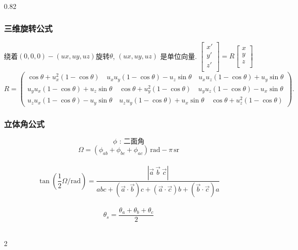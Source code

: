 \begin{small}
\begin{spacing}{0.82}
\subsubsection{三维旋转公式}
绕着$(0,0,0)-(ux,uy,uz)$旋转$\theta$, $(ux,uy,uz)$ 是单位向量. $
	\begin{bmatrix}
	x' \\
	y' \\
	z' \\
	\end{bmatrix} = R
	\begin{bmatrix}
	x \\
	y \\
	z \\
	\end{bmatrix}
	$
\[
R = \left(\begin{smallmatrix}
	\cos \theta +u_x^2 \left(1-\cos \theta\right) \quad
	u_x u_y \left(1-\cos \theta\right) - u_z \sin \theta \quad u_x u_z \left(1-\cos \theta\right) + u_y \sin \theta \\ u_y u_x \left(1-\cos \theta\right) + u_z \sin \theta \quad \cos \theta + u_y^2\left(1-\cos \theta\right) \quad u_y u_z \left(1-\cos \theta\right) - u_x \sin \theta \\ u_z u_x \left(1-\cos \theta\right) - u_y \sin \theta \quad u_z u_y \left(1-\cos \theta\right) + u_x \sin \theta \quad \cos \theta + u_z^2\left(1-\cos \theta\right) 
\end{smallmatrix}\right).
\]

\subsubsection{立体角公式}
\[ \phi \text{ : 二面角}\] 
\[ \Omega = \left(\phi_{ab} + \phi_{bc} + \phi_{ac}\right)\,\mathrm{rad} - \pi\,\mathrm{sr} \]\\
\[\tan \left( \frac{1}{2} \Omega/\mathrm{rad} \right) =
  \frac{\left|\vec a\ \vec b\ \vec c\right|}{abc + \left(\vec a \cdot \vec b\right)c + \left(\vec a \cdot \vec c\right)b + \left(\vec b \cdot \vec c\right)a}\]\\
\[\theta_s = \frac {\theta_a + \theta_b + \theta_c}{2}\]\\
\begin{multicols*}{2}
	

\end{multicols*}
\end{spacing}
\end{small}
